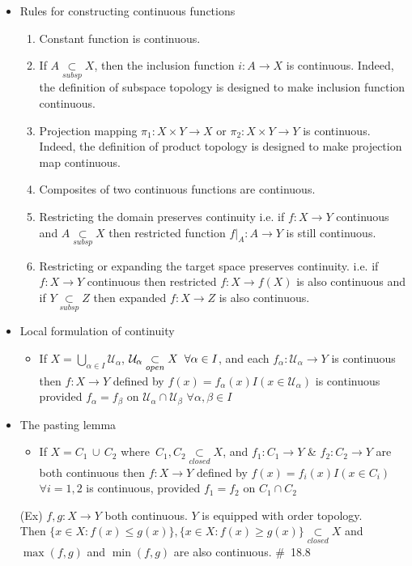 \documentclass[12pt]{article}
\newcommand{\sptwo}{\hspace{0.2cm}}
\newcommand{\spone}{\hspace{0.1cm}}
\newcommand{\open}{\underset{open}{\subset}}
\newcommand{\closed}{\underset{closed}{\subset}}
\newcommand{\subsp}{\underset{subsp}{\subset}}
\begin{document}
\begin{itemize}
\begin{itemize}
	\end{itemize}
	\item Rules for constructing continuous functions
	\begin{enumerate}
		\item Constant function is continuous.
		\item If $A\subsp X$, then the inclusion function $i: A\rightarrow X$ is continuous. Indeed, the definition of subspace topology is designed to make inclusion function continuous.
		\item Projection mapping $\pi_1 : X\times Y\rightarrow X$ or $\pi_2 : X\times Y \rightarrow Y$ is continuous. Indeed, the definition of product topology is designed to make projection map continuous.
		\item Composites of two continuous functions are continuous.
		\item Restricting the domain preserves continuity \sptwo i.e. \spone if $f : X\rightarrow Y$ continuous and $A\subsp X$ then restricted function $f|_A : A\rightarrow Y$ is still continuous.
		\item Restricting or expanding the target space preserves continuity. \sptwo i.e. \spone if $f : X\rightarrow Y$ continuous then restricted $f : X\rightarrow f(X)$ is also continuous and if $Y\subsp Z$ then expanded $f : X\rightarrow Z$ is also continuous.
	\end{enumerate}
	\item Local formulation of continuity
	\begin{itemize}
		\item If $X=\bigcup_{\alpha\in I}\mathcal{U}_\alpha$, \sptwo $\mathcal{U}_\alpha \open X \sptwo \forall \alpha\in I$, \sptwo and each $f_\alpha : \mathcal{U}_\alpha \rightarrow Y $ is continuous then $f : X\rightarrow Y$ defined by $f(x)=f_\alpha(x)I(x\in \mathcal{U}_\alpha)$ is continuous provided $f_\alpha=f_\beta$ on $\mathcal{U}_\alpha\cap \mathcal{U}_\beta$ \sptwo $\forall \alpha, \beta \in I$	
	\end{itemize}
\bigskip
	\item The pasting lemma
	\begin{itemize}
		\item If $X=C_1 \,\cup \,C_2$ where $ \, C_1,C_2\closed X$, \sptwo and $f_1 : C_1 \rightarrow Y$ \& $f_2: C_2 \rightarrow Y$ are both continuous then $f : X\rightarrow Y$ defined by $f(x)=f_i(x)I(x\in C_i)$ \sptwo $\forall i=1,2$ \sptwo is continuous, provided $f_1=f_2$ on $C_1\cap C_2$
	\end{itemize}
	\item[(Ex)] $f, g : X\rightarrow Y$ both continuous. $Y$ is equipped with order topology.\\Then $\{x\in X : f(x)\leq g(x)\}, \{x\in X : f(x)\geq g(x)\} \closed X$ and $\max(f,g)$ and $\min(f,g)$ are also continuous. \quad \#\ 18.8

\end{itemize}
\end{document}
